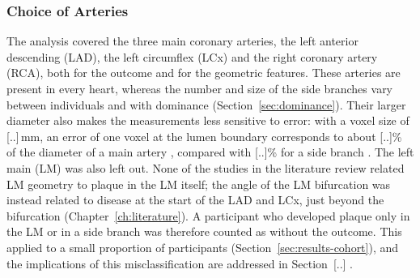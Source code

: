 
\subsubsection{Choice of Arteries}
\label{sec:method-population-arteries}

The analysis covered the three main coronary arteries, the left anterior descending (LAD), the left circumflex (LCx) and the right coronary artery (RCA), both for the outcome and for the geometric features.
These arteries are present in every heart, whereas the number and size of the side branches vary between individuals and with dominance (Section~\ref{sec:dominance}).
Their larger diameter also makes the measurements less sensitive to error: with a voxel size of [..]\,mm, an error of one voxel at the lumen boundary corresponds to about [..]\% of the diameter of a main artery \cite{dodge1992diameter}, compared with [..]\% for a side branch .
The left main (LM) was also left out.
None of the studies in the literature review related LM geometry to plaque in the LM itself; the angle of the LM bifurcation was instead related to disease at the start of the LAD and LCx, just beyond the bifurcation (Chapter~\ref{ch:literature}).
A participant who developed plaque only in the LM or in a side branch was therefore counted as without the outcome.
This applied to a small proportion of participants (Section~\ref{sec:results-cohort}), and the implications of this misclassification are addressed in Section~[..] .
